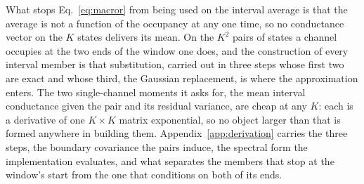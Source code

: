 What stops Eq.~\ref{eq:macror} from being used on the interval average is that the average is not a
function of the occupancy at any one time, so no conductance vector on the $K$ states delivers its
mean. On the $K^2$ pairs of states a channel occupies at the two ends of the window one does, and
the construction of every interval member is that substitution, carried out in three steps whose
first two are exact and whose third, the Gaussian replacement, is where the approximation enters.
The two single-channel moments it asks for, the mean interval conductance given the pair and its
residual variance, are cheap at any $K$: each is a derivative of one $K\times K$ matrix exponential,
so no object larger than that is formed anywhere in building
them. Appendix~\ref{app:derivation} carries the three steps, the boundary covariance the pairs
induce, the spectral form the implementation evaluates, and what separates the members that stop at
the window's start from the one that conditions on both of its ends.

